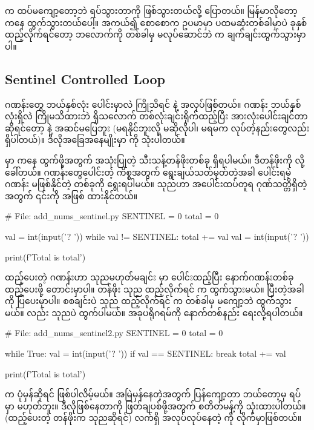  က ထပ်မကျော့တော့ဘဲ  ရပ်သွားတာကို   ဖြစ်သွားတယ်လို့ ပြောတယ်။ မြန်မာလိုတော့  ကနေ ထွက်သွားတယ်ပေါ့။ အကယ်၍ စောစောက ဥပမာမှာ ပထမဆုံးတစ်ခါမှာပဲ ခုနှစ် ထည့်လိုက်ရင်တော့ ဘလောက်ကို တစ်ခါမှ မလုပ်ဆောင်ဘဲ  က ချက်ချင်းထွက်သွားမှာပါ။

\subsection*{Sentinel Controlled Loop}
ဂဏန်းတွေ ဘယ်နှစ်လုံး ပေါင်းမှာလဲ ကြိုသိရင်   နဲ့ အလုပ်ဖြစ်တယ်။ ဂဏန်း ဘယ်နှစ်လုံးရှိလဲ ကြိုမသိထားဘဲ ရှိသလောက် တစ်လုံးချင်းရိုက်ထည့်ပြီး အားလုံးပေါင်းချင်တာဆိုရင်တော့   နဲ့ အဆင်မပြေဘူး (မရနိုင်ဘူးလို့ မဆိုလိုပါ၊ မရမက လုပ်တဲ့နည်းတွေလည်း ရှိပါတယ်)။ ဒီလိုအခြေအနေမျိုးမှာ  ကို သုံးပါတယ်။ 

 မှာ  ကနေ ထွက်ဖို့အတွက် အသုံးပြုတဲ့ သီးသန့်တန်ဖိုးတစ်ခု ရှိရပါမယ်။ ဒီတန်ဖိုးကို  လို့ ခေါ်တယ်။ ဂဏန်းတွေပေါင်းတဲ့ ကိစ္စအတွက်   ရွေးချယ်သတ်မှတ်တဲ့အခါ ပေါင်းရမဲ့ဂဏန်း မဖြစ်နိုင်တဲ့ တစ်ခုကို ရွေးရပါမယ်။ သုညဟာ အပေါင်းထပ်တူရ ဂုဏ်သတ္တိရှိတဲ့အတွက် ၎င်းကို  အဖြစ် ထားနိုင်တယ်။
%
\begin{py}
# File: add_nums_sentinel.py 
SENTINEL = 0
total = 0

val = int(input('? '))
while val != SENTINEL:
    total += val
    val = int(input('? '))

print(f'Total is {total}')
\end{py}
%
ထည့်ပေးတဲ့ ဂဏန်းဟာ သုညမဟုတ်မချင်း  မှာ ပေါင်းထည့်ပြီး နောက်ဂဏန်းတစ်ခု ထည့်ပေးဖို့  တောင်းမှာပါ။  တန်ဖိုး သုည ထည့်လိုက်ရင်  က ထွက်သွားမယ်။ ပြီးတဲ့အခါ  ကို ပြပေးမှာပါ။ စစချင်းပဲ သုည ထည့်လိုက်ရင်  က တစ်ခါမှ မကျော့ဘဲ ထွက်သွားမယ်။  လည်း သုညပဲ ထွက်ပါမယ်။ အခုပရိုဂရမ်ကို နောက်တစ်နည်း ရေးလို့ရပါတယ်။ 
%
\begin{py}
# File: add_nums_sentinel2.py 
SENTINEL = 0
total = 0

while True:
    val = int(input('? '))
    if val == SENTINEL:
        break
    total += val

print(f'Total is {total}')

\end{py}
%

 က ပုံမှန်ဆိုရင်  ဖြစ်ပါလိမ့်မယ်။ အမြဲမှန်နေတဲ့အတွက် ပြန်ကျော့တာ ဘယ်တော့မှ ရပ်မှာ မဟုတ်ဘူး။ ဒီလိုဖြစ်နေတာကို ဖြတ်ချပစ်ဖို့အတွက်  စတိတ်မန့်ကို သုံးထားပါတယ်။  (ထည့်ပေးတဲ့ တန်ဖိုးက သုညဆိုရင်) လက်ရှိ အလုပ်လုပ်နေတဲ့  ကို  လိုက်မှာဖြစ်တယ်။ 

